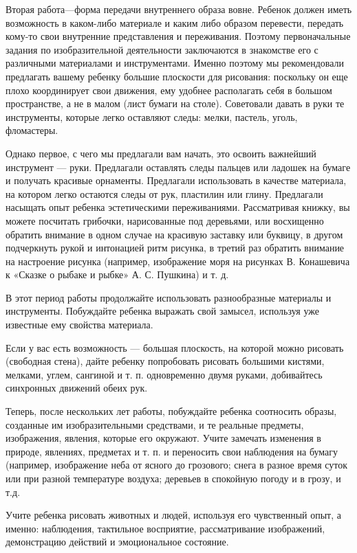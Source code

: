 \documentclass[a5paper]{book}
\begin{document}
Вторая работа---форма передачи внутреннего образа вовне. Ребенок должен
иметь возможность в каком-либо материале и каким либо образом перевести,
передать кому-то свои внутренние представления и переживания. Поэтому
первоначальные задания по изобразительной деятельности заключаются в
знакомстве его с различными материалами и инструментами. Именно поэтому
мы рекомендовали предлагать вашему ребенку большие плоскости для
рисования: поскольку он еще плохо координирует свои движения, ему
удобнее располагать себя в большом пространстве, а не в малом (лист
бумаги на столе). Советовали давать в руки те инструменты, которые легко
оставляют следы: мелки, пастель, уголь, фломастеры.

Однако первое, с чего мы предлагали вам начать, это освоить важнейший
инструмент --- руки. Предлагали оставлять следы пальцев или ладошек на
бумаге и получать красивые орнаменты. Предлагали использовать в качестве
материала, на котором легко остаются следы от рук, пластилин или глину.
Предлагали насыщать опыт ребенка эстетическими переживаниями.
Рассматривая книжку, вы можете посчитать грибочки, нарисованные под
деревьями, или восхищенно обратить внимание в одном случае на красивую
заставку или буквицу, в другом подчеркнуть рукой и интонацией ритм
рисунка, в третий раз обратить внимание на настроение рисунка (например,
изображение моря на рисунках В. Конашевича к «Сказке о рыбаке и рыбке»
А. С. Пушкина) и т. д.

В этот период работы продолжайте использовать разнообразные материалы и
инструменты. Побуждайте ребенка выражать свой замысел, используя уже
известные ему свойства материала.

Если у вас есть возможность --- большая плоскость, на которой можно
рисовать (свободная стена), дайте ребенку попробовать рисовать большими
кистями, мелками, углем, сангиной и т. п. одновременно двумя руками,
добивайтесь синхронных движений обеих рук.

Теперь, после нескольких лет работы, побуждайте ребенка соотносить
образы, созданные им изобразительными средствами, и те реальные
предметы, изображения, явления, которые его окружают. Учите замечать
изменения в природе, явлениях, предметах и т. п. и переносить свои
наблюдения на бумагу (например, изображение неба от ясного до грозового;
снега в разное время суток или при разной температуре воздуха; деревьев
в спокойную погоду и в грозу, и т.д.

Учите ребенка рисовать животных и людей, используя его чувственный опыт,
а именно: наблюдения, тактильное восприятие, рассматривание изображений,
демонстрацию действий и эмоциональное состояние.
\end{document}
